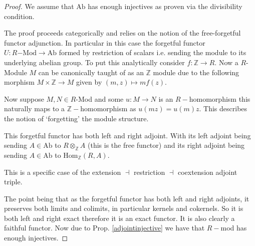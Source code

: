 \documentclass[12pt]{article}
\numberwithin{equation}{section}
\newcommand{\Z}{\mathbb{Z}}
\newcommand{\Hom}{{\mathrm{Hom}}}
\begin{document}
\begin{proof}
	We assume that $\mathrm{Ab}$ has enough injectives as proven via the divisibility condition.
	
	The proof proceeds categorically and relies on the notion of the free-forgetful functor adjunction. In particular in this case the forgetful functor $U: R\mathrm{-Mod} \to \mathrm{Ab}$ formed by restriction of scalars i.e. sending the module to its underlying abelian group. To put this analytically consider $f: \Z \to R$. Now a $R$-Module $M$ can be canonically taught of as an $\Z$ module due to the following morphism $M \times \Z \to M$ given by $(m,z) \mapsto mf(z)$.
	
	 Now suppose $M,N \in R$-Mod and some $u:M \to N$ is an $R-$homomorphism this naturally maps to a $\Z-$homomorphism as $u(mz)=u(m)z$. This describes the notion of `forgetting' the module structure.
	
	This forgetful functor has both left and right adjoint. With its left adjoint being sending $A \in \mathrm{Ab} $ to $R \otimes_\Z A$ (this is the free functor) and its right adjoint being sending $A\in \mathrm{Ab}$ to $\Hom_\Z(R,A)$.
	
	This is a specific case of the extension $\dashv $ restriction $\dashv$ coextension adjoint triple.
	
	The point being that as the forgetful functor has both left and right adjoints, it preserves both limits and colimits, in particular kernels and cokernels. So it is both left and right exact therefore it is an exact functor. It is also clearly a faithful functor. Now due to Prop. \ref{adjointinjective} we have that $R-$mod has enough injectives.
\end{proof}
\end{document}
